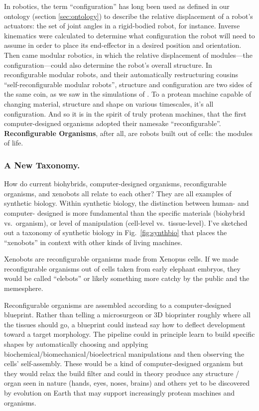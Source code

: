 In robotics, the term ``configuration'' has long been used
as defined in our ontology (section \ref{sec:ontology})
to describe the relative displacement of a robot's actuators: the set of joint angles in a rigid-bodied robot, for instance.
Inverse kinematics were calculated to determine what configuration the robot will need to assume in order to 
place its end-effector in a desired position and orientation.
Then came modular robotics, in which the relative displacement of modules---the configuration---could also determine the robot's overall structure.
In reconfigurable modular robots, and their automatically restructuring cousins ``self-reconfigurable modular robots'', structure and configuration are two sides of the same coin, as we saw in the simulations of \citet{pathak2019learning}.
To a protean machine capable of changing material, structure and shape on various timescales,
it's all configuration.
And so it is in the spirit of truly protean machines,
that the first computer-designed organisms
adopted their namesake ``reconfigurable''.
\textbf{Reconfigurable Organisms}, after all, are
robots built out of cells: the modules of life.


\subsubsection*{A New Taxonomy.}

How do current biohybrids,
computer-designed organisms,
reconfigurable organisms,
and xenobots
all relate to each other?
They are all examples of synthetic biology.
Within synthetic biology, the distinction between human- and computer- designed is more fundamental than the specific materials (biohybrid vs.~organism),
or level of manipulation (cell-level vs.~tissue-level).
I've sketched out a taxonomy of synthetic biology in  Fig.~\ref{fig:synthbio} that places the ``xenobots'' in context with other kinds of living machines.

Xenobots are reconfigurable organisms made from Xenopus cells.
If we made reconfigurable organisms out of cells taken from early elephant embryos, they would be called ``elebots'' or likely something more catchy by the public and the memesphere.

Reconfigurable organisms are assembled according to a computer-designed blueprint.
Rather than telling a microsurgeon or 3D bioprinter roughly where all the tissues should go, 
a blueprint could instead say how to deflect development toward a target morphology.
The pipeline could in principle learn to build specific shapes by automatically choosing and applying biochemical/biomechanical/bioelectrical
manipulations and then observing the cells' self-assembly.
These would be a kind of computer-designed organism but they would relax the build filter and could in theory produce any structure / organ seen in nature (hands, eyes, noses, brains) and others yet to be discovered by evolution on Earth that may support increasingly protean machines and organisms.


